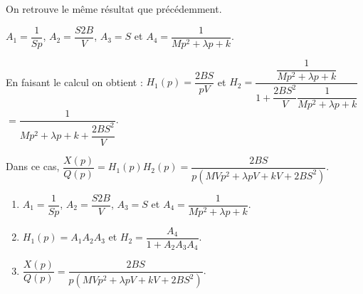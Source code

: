 \footnotesize
\begin{figure}[!h]
\end{figure}
\normalsize

On retrouve le même résultat que précédemment. 


$A_1=\dfrac{1}{Sp}$,  $A_2 = \dfrac{S2B}{V} $,  $A_3 = S$  et $A_4 = \dfrac{1}{Mp^2  +\lambda p  + k}$.


En faisant le calcul on obtient : 
$H_1(p)=\dfrac{2BS}{pV}  $ et $H_2 = \dfrac{\dfrac{1}{Mp^2  +\lambda p  + k}}{1+ \dfrac{2BS^2}{V}\dfrac{1}{Mp^2  +\lambda p  + k} }$  $= \dfrac{1}{Mp^2  +\lambda p  + k+ \dfrac{2BS^2}{V} }$.


\else
\fi

\ifprof

Dans ce cas, $\dfrac{X(p)}{Q(p)}=H_1(p)H_2(p)=\dfrac{2BS}{p\left(MVp^2  +\lambda pV  + kV+ 2BS^2\right) }$.

\else
\fi








\ifprof
\else
\ifcolle
\else
\begin{solution}
\begin{enumerate}
\item $A_1=\dfrac{1}{Sp}$,  $A_2 = \dfrac{S2B}{V} $,  $A_3 = S$  et $A_4 = \dfrac{1}{Mp^2  +\lambda p  + k}$.
\item $H_1(p)=A_1  A_2A_3$ et $H_2 = \dfrac{A_4}{1+ A_2A_3A_4 }$.
\item $\dfrac{X(p)}{Q(p)}=\dfrac{2BS}{p\left(MVp^2  +\lambda pV  + kV+ 2BS^2\right) }$.
\end{enumerate} 
\end{solution}
\fi
{}

\fi

